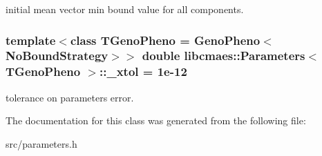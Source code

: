 initial mean vector min bound value for all components. \hypertarget{classlibcmaes_1_1Parameters_aaa9e8eedba7d7140d116163b40f653f8}{
\subsubsection[{\-\_\-xtol}]{\setlength{\rightskip}{0pt plus 5cm}template$<$class T\-Geno\-Pheno = Geno\-Pheno$<$\-No\-Bound\-Strategy$>$$>$ double {\bf libcmaes\-::\-Parameters}$<$ T\-Geno\-Pheno $>$\-::\-\_\-xtol = 1e-\/12}}\label{classlibcmaes_1_1Parameters_aaa9e8eedba7d7140d116163b40f653f8}
tolerance on parameters error. 

The documentation for this class was generated from the following file\-:\begin{DoxyCompactItemize}
\item 
src/parameters.\-h\end{DoxyCompactItemize}
